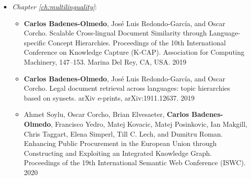 \begin{itemize}
\begin{itemize}
\end{itemize}
\item \textit{Chapter \ref{ch:multilinguality}}:
\begin{itemize}
\item \textbf{Carlos Badenes-Olmedo}, José Luis Redondo-García, and Oscar Corcho. Scalable Cross-lingual Document Similarity through Language-specific Concept Hierarchies. Proceedings of the 10th International Conference on Knowledge Capture (K-CAP). Association for Computing Machinery, 147–153. Marina Del Rey, CA, USA. 2019
\item \textbf{Carlos Badenes-Olmedo}, José Luis Redondo-García, and Oscar Corcho. Legal document retrieval across languages: topic hierarchies based on synsets. arXiv e-prints, arXiv:1911.12637. 2019
\item Ahmet Soylu, Oscar Corcho, Brian Elvesaeter, \textbf{Carlos Badenes-Olmedo}, Francisco Yedro, Matej Kovacic, Matej Posinkovic, Ian Makgill, Chris Taggart, Elena Simperl, Till C. Lech, and Dumitru Roman. Enhancing Public Procurement in the European Union through Constructing and Exploiting an Integrated Knowledge Graph. Proceedings of the 19th International Semantic Web Conference (ISWC). 2020
\end{itemize}
\end{itemize}



